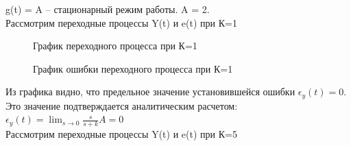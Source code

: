 \documentclass[a4paper, 11pt]{article}
\begin{document}
g(t) = A – стационарный режим работы. A = 2.\\

Рассмотрим переходные процессы Y(t) и e(t) при К=1

\begin{figure}[h!]
    \caption{График переходного процесса при К=1}
    \label{two}
\end{figure}
\begin{figure}[h!]
    \caption{График ошибки переходного процесса при К=1}
    \label{tree}
\end{figure}

\newpage

Из графика видно, что предельное значение установившейся ошибки $\epsilon_y(t)=0$. Это значение подтверждается аналитическим расчетом: $\epsilon_y(t)=\lim_{s\to0}\frac{s}{s+k}A=0$\\

Рассмотрим переходные процессы Y(t) и e(t) при К=5
\end{document}
